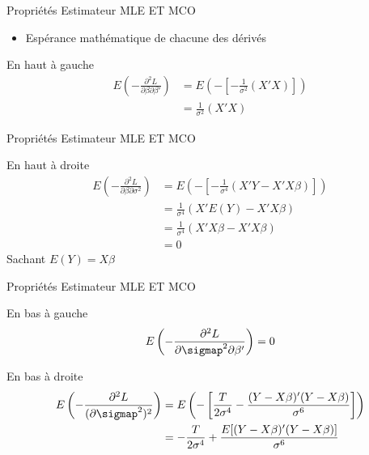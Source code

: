 \documentclass{beamer}
\begin{document}
\begin{frame}{Propriétés Estimateur MLE ET MCO}
\begin{itemize}
\item Espérance mathématique de chacune des dérivés
\end{itemize}
\begin{block}{En haut à gauche}
\begin{align*}
E \left(-\frac{\partial^2 L}{\partial \beta \partial \beta'} \right) &= E \left(- \left[-\frac{1}{\sigma^2} (X'X)  \right]\right) \\ & = \frac{1}{\sigma^2}(X'X)
\end{align*}
\end{block}
\end{frame}

\begin{frame}{Propriétés Estimateur MLE ET MCO}

\begin{block}{En haut à droite}
\begin{align*}
E \left(-\frac{\partial^2 L}{\partial \beta \partial \sigma^2} \right) &= E \left(- \left[-\frac{1}{\sigma^4} (X'Y-X'X \beta)  \right]\right) \\ & = \frac{1}{\sigma^4}(X'E(Y)-X'X \beta) \\ & = \frac{1}{\sigma^4} (X'X \beta - X'X \beta) \\ & = 0
\end{align*}
Sachant $E(Y)=X \beta$
\end{block}
\end{frame}

\begin{frame}{Propriétés Estimateur MLE ET MCO}

\begin{block}{En bas à gauche}
\begin{align*}
E \left(-\frac{\partial^2 L}{\partial \sigmap^2 \partial \beta'} \right) = 0
\end{align*}
\end{block}
\begin{block}{En bas à droite}
\begin{align*}
E \left(-\frac{\partial^2 L}{(\partial \sigmap^2)^2} \right) & =E \left(- \left[\frac{T}{2 \sigma^4}-\frac{(Y-X \beta)'(Y-X \beta)}{\sigma^6} \right] \right) \\ & = -\frac{T}{2 \sigma^4}+\frac{E[(Y-X \beta)'(Y-X \beta)]}{\sigma^6}
\end{align*}
\end{block}
\end{frame}
\end{document}
